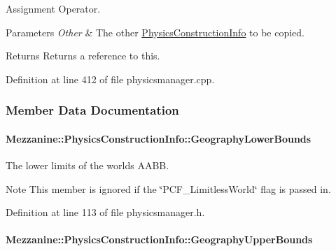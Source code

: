 Assignment Operator. 


\begin{DoxyParams}{Parameters}
{\em Other} & The other \hyperlink{classMezzanine_1_1PhysicsConstructionInfo}{PhysicsConstructionInfo} to be copied. \\
\hline
\end{DoxyParams}
\begin{DoxyReturn}{Returns}
Returns a reference to this. 
\end{DoxyReturn}


Definition at line 412 of file physicsmanager.cpp.



\subsubsection{Member Data Documentation}
\hypertarget{classMezzanine_1_1PhysicsConstructionInfo_aed6f8f0555fe4dec58758f6d774cbcee}{
\paragraph[{GeographyLowerBounds}]{ {\bf Mezzanine::PhysicsConstructionInfo::GeographyLowerBounds}}\hfill}
\label{classMezzanine_1_1PhysicsConstructionInfo_aed6f8f0555fe4dec58758f6d774cbcee}


The lower limits of the worlds AABB. 

\begin{DoxyNote}{Note}
This member is ignored if the \char`\"{}PCF\_\-LimitlessWorld\char`\"{} flag is passed in. 
\end{DoxyNote}


Definition at line 113 of file physicsmanager.h.

\hypertarget{classMezzanine_1_1PhysicsConstructionInfo_aa1794e928aea2ce5f2e9ad4f467b1c14}{
\paragraph[{GeographyUpperBounds}]{ {\bf Mezzanine::PhysicsConstructionInfo::GeographyUpperBounds}}\hfill}
\label{classMezzanine_1_1PhysicsConstructionInfo_aa1794e928aea2ce5f2e9ad4f467b1c14}


